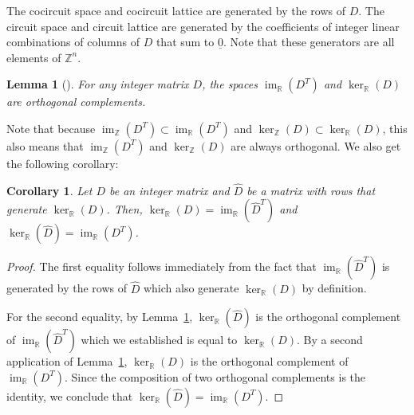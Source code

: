 \documentclass[10pt,a4paper]{amsart}
\newtheorem{lemma}[theorem]{Lemma}
\newtheorem{coro}[theorem]{Corollary}
\theoremstyle{definition}
\newcommand{\un}{\underline}
\newcommand{\R}{\mathbb{R}}
\newcommand{\Z}{\mathbb{Z}}
\newcommand{\what}{\widehat}
\DeclareMathOperator{\Ima}{im}
\begin{document}
The cocircuit space and cocircuit lattice are generated by the rows of $D$. The circuit space and circuit lattice are generated by the coefficients of integer linear combinations of columns of $D$ that sum to $\un 0$. Note that these generators are all elements of $\Z^n$.



\setcounter{theorem}{5}
\begin{lemma}[{\cite[Proposition~5.1]{CutsFlows}}]\label{lem:orthogonality}
For any integer matrix $D$, the spaces $\Ima_\R(D^T)$ and $\ker_\R(D)$ are orthogonal complements. 
\end{lemma}

Note that because $\Ima_\Z(D^T) \subset \Ima_\R(D^T)$ and $\ker_\Z(D) \subset \ker_\R(D)$, this also means that $\Ima_\Z(D^T)$ and $\ker_\Z(D)$ are always orthogonal. We also get the following corollary:

\begin{coro}\label{cor:cutofflow}
Let $D$ be an integer matrix and $\what D$ be a matrix with rows that generate $\ker_\R(D)$. Then, $\ker_\R(D) = \Ima_\R(\what D^T)$ and $\ker_\R(\what D) = \Ima_\R(D^T)$. 
\end{coro}

\begin{proof}
The first equality follows immediately from the fact that $\Ima_\R(\what D^T)$ is generated by the rows of $\what D$ which also generate $\ker_\R(D)$ by definition. 

For the second equality, by Lemma~\ref{lem:orthogonality}, $\ker_\R(\what D)$ is the orthogonal complement of $\Ima_\R(\what D^T)$ which we established is equal to $\ker_\R(D)$. By a second application of Lemma~\ref{lem:orthogonality}, $\ker_\R(D)$ is the orthogonal complement of $\Ima_\R(D^T)$. Since the composition of two orthogonal complements is the identity, we conclude that $\ker_\R(\what D) = \Ima_\R(D^T)$. 
\end{proof}
\end{document}
